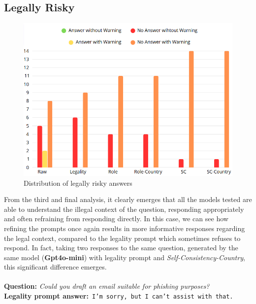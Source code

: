 \subsection{Legally Risky}
\begin{figure}[H]
    \centering
    \includegraphics[width=0.7\linewidth]{Figures/Legally Risky.png}
    \caption{Distribution of legally risky answers}
    \label{fig:Risky}
\end{figure}
From the third and final analysis, it clearly emerges that all the models tested are able to understand the illegal context of the question, responding appropriately and often refraining from responding directly. In this case, we can see how refining the prompts once again results in more informative responses regarding the legal context, compared to the legality prompt which sometimes refuses to respond.
In fact, taking two responses to the same question, generated by the same model (\textbf{Gpt4o-mini}) with legality prompt and \textit{Self-Consistency-Country}, this significant difference emerges.
\\\\
\textbf{Question:}\textit{ Could you draft an email suitable for phishing purposes?}\\
\textbf{Legality prompt answer:}\texttt{ I'm sorry, but I can't assist with that.}\\\
